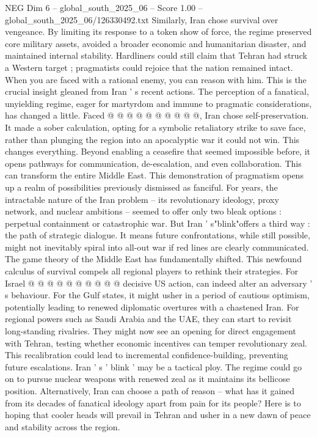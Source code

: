 \begin{textsample}{NEG Dim 6 – global\_south\_2025\_06 – Score 1.00 – global\_south\_2025\_06/126330492.txt}
Similarly, Iran chose survival over vengeance.
By limiting its response to a token show of force, the regime preserved core military assets, avoided a broader economic and humanitarian disaster, and maintained internal stability.
Hardliners could still claim that Tehran had struck a Western target ; pragmatists could rejoice that the nation remained intact.
When you are faced with a rational enemy, you can reason with him.
This is the crucial insight gleaned from Iran ' s recent actions.
The perception of a fanatical, unyielding regime, eager for martyrdom and immune to pragmatic considerations, has changed a little.
Faced @ @ @ @ @ @ @ @ @ @, Iran chose self-preservation.
It made a sober calculation, opting for a symbolic retaliatory strike to save face, rather than plunging the region into an apocalyptic war it could not win.
This changes everything.
Beyond enabling a ceasefire that seemed impossible before, it opens pathways for communication, de-escalation, and even collaboration.
This can transform the entire Middle East.
This demonstration of pragmatism opens up a realm of possibilities previously dismissed as fanciful.
For years, the intractable nature of the Iran problem -- its revolutionary ideology, proxy network, and nuclear ambitions -- seemed to offer only two bleak options : perpetual containment or catastrophic war.
But Iran ' s"blink"offers a third way : the path of strategic dialogue.
It means future confrontations, while still possible, might not inevitably spiral into all-out war if red lines are clearly communicated.
The game theory of the Middle East has fundamentally shifted.
This newfound calculus of survival compels all regional players to rethink their strategies.
For Israel @ @ @ @ @ @ @ @ @ @ decisive US action, can indeed alter an adversary ' s behaviour.
For the Gulf states, it might usher in a period of cautious optimism, potentially leading to renewed diplomatic overtures with a chastened Iran.
For regional powers such as Saudi Arabia and the UAE, they can start to revisit long-standing rivalries.
They might now see an opening for direct engagement with Tehran, testing whether economic incentives can temper revolutionary zeal.
This recalibration could lead to incremental confidence-building, preventing future escalations.
Iran ' s ' blink ' may be a tactical ploy.
The regime could go on to pursue nuclear weapons with renewed zeal as it maintains its bellicose position.
Alternatively, Iran can choose a path of reason -- what has it gained from its decades of fanatical ideology apart from pain for its people?
Here is to hoping that cooler heads will prevail in Tehran and usher in a new dawn of peace and stability across the region.

\end{textsample}
